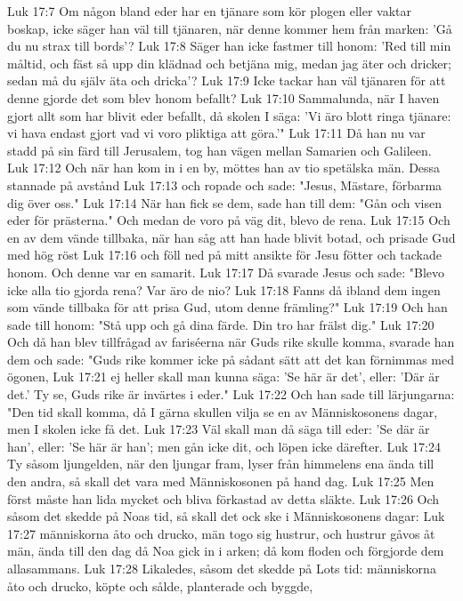 Luk 17:7  Om någon bland eder har en tjänare som kör plogen eller vaktar boskap, icke säger han väl till tjänaren, när denne kommer hem från marken: 'Gå du nu strax till bords'?
Luk 17:8  Säger han icke fastmer till honom: 'Red till min måltid, och fäst så upp din klädnad och betjäna mig, medan jag äter och dricker; sedan må du själv äta och dricka'?
Luk 17:9  Icke tackar han väl tjänaren för att denne gjorde det som blev honom befallt?
Luk 17:10  Sammalunda, när I haven gjort allt som har blivit eder befallt, då skolen I säga: 'Vi äro blott ringa tjänare: vi hava endast gjort vad vi voro pliktiga att göra.'"
Luk 17:11  Då han nu var stadd på sin färd till Jerusalem, tog han vägen mellan Samarien och Galileen.
Luk 17:12  Och när han kom in i en by, möttes han av tio spetälska män. Dessa stannade på avstånd
Luk 17:13  och ropade och sade: "Jesus, Mästare, förbarma dig över oss."
Luk 17:14  När han fick se dem, sade han till dem: "Gån och visen eder för prästerna." Och medan de voro på väg dit, blevo de rena.
Luk 17:15  Och en av dem vände tillbaka, när han såg att han hade blivit botad, och prisade Gud med hög röst
Luk 17:16  och föll ned på mitt ansikte för Jesu fötter och tackade honom. Och denne var en samarit.
Luk 17:17  Då svarade Jesus och sade: "Blevo icke alla tio gjorda rena? Var äro de nio?
Luk 17:18  Fanns då ibland dem ingen som vände tillbaka för att prisa Gud, utom denne främling?"
Luk 17:19  Och han sade till honom: "Stå upp och gå dina färde. Din tro har frälst dig."
Luk 17:20  Och då han blev tillfrågad av fariséerna när Guds rike skulle komma, svarade han dem och sade: "Guds rike kommer icke på sådant sätt att det kan förnimmas med ögonen,
Luk 17:21  ej heller skall man kunna säga: 'Se här är det', eller: 'Där är det.' Ty se, Guds rike är invärtes i eder."
Luk 17:22  Och han sade till lärjungarna: "Den tid skall komma, då I gärna skullen vilja se en av Människosonens dagar, men I skolen icke få det.
Luk 17:23  Väl skall man då säga till eder: 'Se där är han', eller: 'Se här är han'; men gån icke dit, och löpen icke därefter.
Luk 17:24  Ty såsom ljungelden, när den ljungar fram, lyser från himmelens ena ända till den andra, så skall det vara med Människosonen på hand dag.
Luk 17:25  Men först måste han lida mycket och bliva förkastad av detta släkte.
Luk 17:26  Och såsom det skedde på Noas tid, så skall det ock ske i Människosonens dagar:
Luk 17:27  människorna åto och drucko, män togo sig hustrur, och hustrur gåvos åt män, ända till den dag då Noa gick in i arken; då kom floden och förgjorde dem allasammans.
Luk 17:28  Likaledes, såsom det skedde på Lots tid: människorna åto och drucko, köpte och sålde, planterade och byggde,
